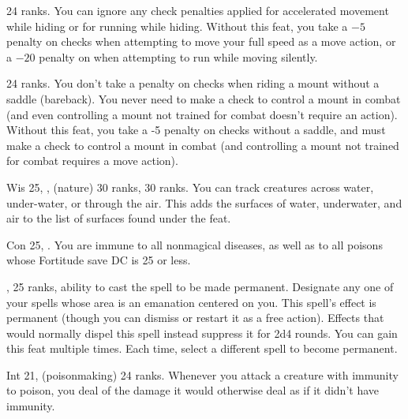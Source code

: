 {}
{ 24 ranks.}
{
  You can ignore any check penalties applied for accelerated movement while hiding or for running while hiding.
}
{
  Without this feat, you take a $-5$ penalty on  checks when attempting to move your full speed as a move action, or a $-20$ penalty on  when attempting to run while moving silently.
}{}

{}
{ 24 ranks.}
{You don't take a penalty on  checks when riding a mount without a saddle (bareback). You never need to make a  check to control a mount in combat (and even controlling a mount not trained for combat doesn't require an action).}
{Without this feat, you take a -5 penalty on  checks without a saddle, and must make a  check to control a mount in combat (and controlling a mount not trained for combat requires a move action).}{}

{Wis 25, ,  (nature) 30 ranks,  30 ranks.}
{You can track creatures across water, under-water, or through the air. This adds the surfaces of water, underwater, and air to the list of surfaces found under the  feat.}


{Con 25, .}
{You are immune to all nonmagical diseases, as well as to all poisons whose Fortitude save DC is 25 or less.}

{}
{,  25 ranks, ability to cast the spell to be made permanent.}
{Designate any one of your spells whose area is an emanation centered on you. This spell's effect is permanent (though you can dismiss or restart it as a free action). Effects that would normally dispel this spell instead suppress it for 2d4 rounds.}
{}{You can gain this feat multiple times. Each time, select a different spell to become permanent.}

{Int 21,  (poisonmaking) 24 ranks.}
{Whenever you attack a creature with immunity to poison, you deal \onehalf of the damage it would otherwise deal as if it didn't have immunity.}

